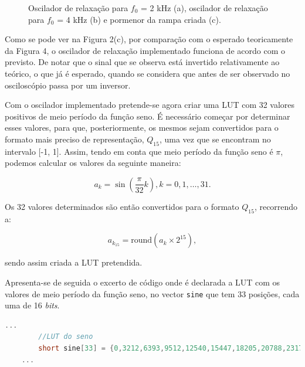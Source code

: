 \documentclass[11pt]{article}
\numberwithin{equation}{section}
\begin{document}
\begin{figure}[H]
	\vspace{-0.8em}
	\caption{Oscilador de relaxação para $f_{0}$ = 2 kHz (a), oscilador de relaxação para $f_{0}$ = 4 kHz (b) e pormenor da rampa criada (c).}
	\vspace{-0.8em}
\end{figure}

Como se pode ver na Figura 2(c), por comparação com o esperado teoricamente da Figura 4, o oscilador de relaxação implementado funciona de acordo com o previsto. De notar que o sinal que se observa está invertido relativamente ao teórico, o que já é esperado, quando se considera que antes de ser observado no osciloscópio passa por um inversor.

Com o oscilador implementado pretende-se agora criar uma LUT com 32 valores positivos de meio período da função seno. É necessário começar por determinar esses valores, para que, posteriormente, os mesmos sejam convertidos para o formato mais preciso de representação, $Q_{15}$, uma vez que se encontram no intervalo [-1, 1]. Assim, tendo em conta que meio período da função seno é $\pi$, podemos calcular os valores da seguinte maneira:

\vspace{-3mm}
\begin{equation}
a_{k} = \sin \left( \frac{\pi}{32}k \right), k = 0, 1, \ldots, 31.
\end{equation}

\vspace{1mm}
Os 32 valores determinados são então convertidos para o formato $Q_{15}$, recorrendo a:

\vspace{-3mm}
\begin{equation}
a_{k_{15}} = \text{round}\left(a_{k} \times 2^{15} \right),
\end{equation} 

\vspace{1mm}
sendo assim criada a LUT pretendida.

Apresenta-se de seguida o excerto de código onde é declarada a LUT com os valores de meio período da função seno, no vector \texttt{sine} que tem 33 posições, cada uma de 16 \textit{bits}. 

\begin{lstlisting}[language=C]
	...
		//LUT do seno
		short sine[33] = {0,3212,6393,9512,12540,15447,18205,20788,23170,25330,27246,28899,30274,31357,		32138,32610,32767,32610,32138,31357,30274,28899,27246,25330,23170,20788,18205,	15447,12540,9512,6393,3212,0}; 
	...
\end{lstlisting}
\end{document}
